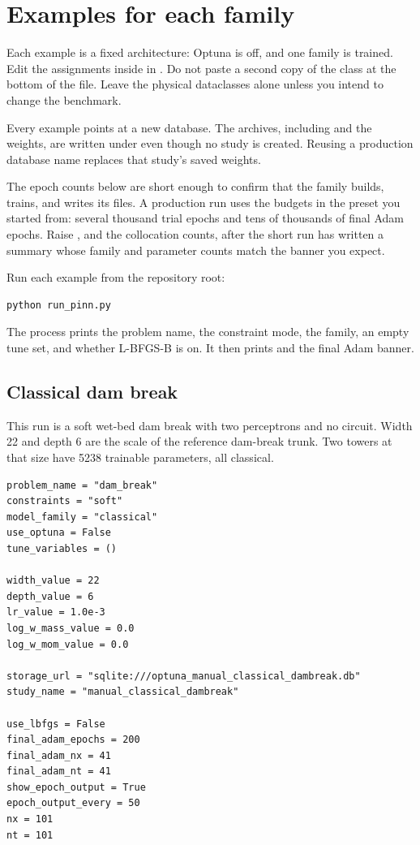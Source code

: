 \chapter{Examples for each family}
\label{ch:examples}

Each example is a fixed architecture: Optuna is off, and one family is trained.
Edit the assignments inside  in .
Do not paste a second copy of the class at the bottom of the file.
Leave the physical dataclasses alone unless you intend to change the benchmark.

Every example points  at a new database.
The archives, including  and the weights, are written under  even though no study is created.
Reusing a production database name replaces that study's saved weights.

The epoch counts below are short enough to confirm that the family builds, trains, and writes its files.
A production run uses the budgets in the preset you started from: several thousand trial epochs and tens of thousands of final Adam epochs.
Raise , and the collocation counts, after the short run has written a summary whose family and parameter counts match the banner you expect.

Run each example from the repository root:

\begin{lstlisting}[style=sh]
python run_pinn.py
\end{lstlisting}

The process prints the problem name, the constraint mode, the family, an empty tune set, and whether L-BFGS-B is on.
It then prints  and the final Adam banner.

\section{Classical dam break}
\label{ex:classical}

This run is a soft wet-bed dam break with two perceptrons and no circuit.
Width 22 and depth 6 are the scale of the reference dam-break trunk.
Two towers at that size have 5238 trainable parameters, all classical.

\begin{lstlisting}
problem_name = "dam_break"
constraints = "soft"
model_family = "classical"
use_optuna = False
tune_variables = ()

width_value = 22
depth_value = 6
lr_value = 1.0e-3
log_w_mass_value = 0.0
log_w_mom_value = 0.0

storage_url = "sqlite:///optuna_manual_classical_dambreak.db"
study_name = "manual_classical_dambreak"

use_lbfgs = False
final_adam_epochs = 200
final_adam_nx = 41
final_adam_nt = 41
show_epoch_output = True
epoch_output_every = 50
nx = 101
nt = 101
\end{lstlisting}


